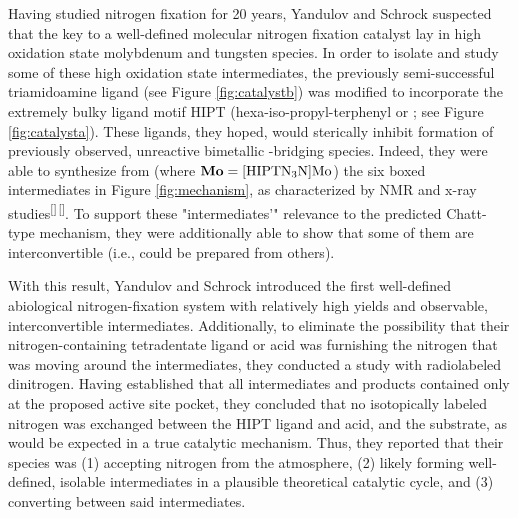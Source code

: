 \documentclass[titlepage,12pt]{article}
\begin{document}
Having studied nitrogen fixation for 20 years, Yandulov and Schrock suspected that the key to a well-defined molecular nitrogen fixation catalyst lay in high oxidation state molybdenum and tungsten species. In order to isolate and study some of these high oxidation state intermediates, the previously semi-successful triamidoamine ligand  (see Figure \ref{fig:catalystb}) was modified to incorporate the extremely bulky ligand motif HIPT (hexa-iso-propyl-terphenyl or ; see Figure \ref{fig:catalysta}). These ligands, they hoped, would sterically inhibit formation of previously observed, unreactive bimetallic -bridging species. Indeed, they were able to synthesize from  (where $\ce{\textbf{Mo}}=\ce{[HIPTN3N]Mo}$) the six boxed intermediates in Figure \ref{fig:mechanism}, as characterized by NMR and x-ray studies\textsuperscript{[}\autocite{bib:Intermediates146}\textsuperscript{]\,[}\autocite{bib:Intermediates235}\textsuperscript{]}. To support these "intermediates'" relevance to the predicted Chatt-type mechanism, they were additionally able to show that some of them are interconvertible (i.e., could be prepared from others).\par
With this result, Yandulov and Schrock introduced the first well-defined abiological nitrogen-fixation system with relatively high yields and observable, interconvertible intermediates. Additionally, to eliminate the possibility that their nitrogen-containing tetradentate  ligand or acid was furnishing the nitrogen that was moving around the intermediates, they conducted a study with radiolabeled dinitrogen. Having established that all intermediates and products contained only  at the proposed active site pocket, they concluded that no isotopically labeled nitrogen was exchanged between the HIPT ligand and acid, and the substrate, as would be expected in a true catalytic mechanism. Thus, they reported that their  species was (1) accepting nitrogen from the atmosphere, (2) likely forming well-defined, isolable intermediates in a plausible theoretical catalytic cycle, and (3) converting between said intermediates.
\end{document}

